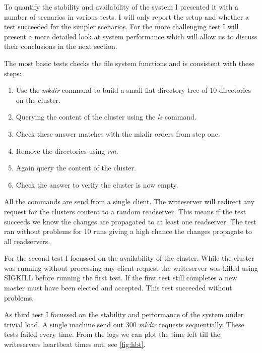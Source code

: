 To quantify the stability and availability of the system I presented it with a number of scenarios in various tests. I will only report the setup and whether a test succeeded for the simpler scenarios. For the more challenging test I will present a more detailed look at system performance which will allow us to discuss their conclusions in the next section.

The most basic tests checks the file system functions and is consistent with these steps: 
\begin{enumerate}
	\item Use the \textit{mkdir} command to build a small flat directory tree of $10$ directories on the cluster.
	\item Querying the content of the cluster using the \textit{ls} command. 
	\item Check these answer matches with the mkdir orders from step one.
	\item Remove the directories using \textit{rm}.
	\item Again query the content of the cluster.
	\item Check the answer to verify the cluster is now empty.
\end{enumerate}
All the commands are send from a single client. The writeserver will redirect any request for the clusters content to a random readserver. This means if the test succeeds we know the changes are propagated to at least one readserver. The test ran without problems for $10$ runs giving a high chance the changes propagate to all readservers.

For the second test I focussed on the availability of the cluster. While the cluster was running without processing any client request the writeserver was killed using \textsc{SIGKILL} before running the first test. If the first test still completes a new master must have been elected and accepted. This test succeeded without problems.

As third test I focussed on the stability and performance of the system under trivial load. A single machine send out $300$ \textit{mkdir} requests sequentially. These tests failed every time. From the logs we can plot the time left till the writeservers heartbeat times out, see \cref{fig:hbt}.

